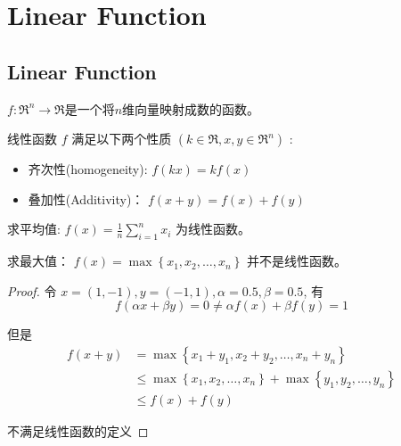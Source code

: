 \chapter{Linear Function}

\section{Linear Function}

\begin{definition}
    $f: \mathfrak{R}^{n} \rightarrow \mathfrak{R}$是一个将$n$维向量映射成数的函数。 

    线性函数 $ f $ 满足以下两个性质 $ \left(k \in \mathfrak{R}, x, y \in \mathfrak{R}^{n}\right) $ :

    \begin{itemize}
        \item 齐次性(homogeneity): $ f(k x)=k f(x) $
        \item 叠加性(Additivity)： $ f(x+y)=f(x)+f(y) $
    \end{itemize}
\end{definition}

\begin{example}
    求平均值: $ f(x)=\frac{1}{n} \sum_{i=1}^{n} x_{i} $ 为线性函数。 
\end{example}

\begin{example}
    求最大值： $ f(x)=\max \left\{x_{1}, x_{2}, \ldots, x_{n}\right\} $ 并不是线性函数。 
\end{example}

\begin{proof}
   令 $ x=(1,-1), y=(-1,1), \alpha=0.5, \beta=0.5 $, 
   有 \begin{equation} f(\alpha x+\beta y)=0 \neq \alpha f(x)+\beta f(y)=1 \end{equation}

    但是
   \begin{equation} \begin{aligned} f(x+y) 
    &=\max \left\{x_{1}+y_{1}, x_{2}+y_{2}, \ldots, x_{n}+y_{n}\right\} 
    \\ & \leq \max \left\{x_{1}, x_{2}, \ldots, x_{n}\right\}+\max \left\{y_{1}, y_{2}, \ldots, y_{n}\right\} 
    \\ & \leq f(x)+f(y) \end{aligned} \end{equation}

    不满足线性函数的定义
\end{proof}

